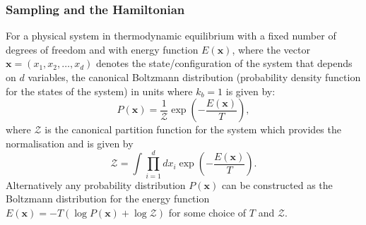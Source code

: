 \documentclass[12pt]{article}
\begin{document}
        \subsubsection{Sampling and the Hamiltonian}
            \label{sec:SamplingAndTheHamiltonian}
            For a physical system in thermodynamic equilibrium with a fixed number of degrees of freedom and with energy function $E\left(\bm{x}\right)$, where the vector $\bm{x} = \left(x_{1},x_{2},\dots,x_{d}\right)$ denotes the state/configuration of the system that depends on $d$ variables, the canonical Boltzmann distribution (probability density function for the states of the system) in units where $k_b=1$ is given by:
            \begin{equation}
                \label{eq:BoltzmannDistribution}
                P\left(\bm{x}\right) = \frac{1}{\mathcal{Z}} \exp{\left(-\frac{E\left(\bm{x}\right)}{T} \right)},
            \end{equation}
            where $\mathcal{Z}$ is the canonical partition function for the system which provides the normalisation and is given by 
            \begin{equation}
                \label{eq:JointPartitionFunction}
                \mathcal{Z} = \int\prod_{i=1}^{d}dx_{i} \exp{\left(-\frac{E\left(\bm{x}\right)}{T} \right)}.
            \end{equation}
            Alternatively any probability distribution $P\left(\bm{x}\right)$ can be constructed as the Boltzmann distribution for the energy function $ E\left(\bm{x}\right) = -T\left(\log{P\left(\bm{x}\right)} + \log{\mathcal{Z}}\right)$ for some choice of $T$ and $\mathcal{Z}$. 
\end{document}
